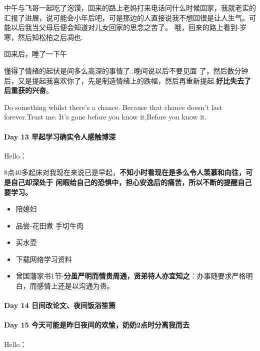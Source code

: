\documentclass[UTF8,a4paper,8pt]{ctexart}
\begin{document}
	     中午与飞哥一起吃了泡馍，回来的路上老妈打来电话问什么时候回家，我就老实的汇报了进展，说可能会小年后吧，可是那边的人直接说我不想回很是让人生气。可能以后我当父母后便会知道对儿女回家的思念之苦了。
	     哦，回来的路上看到-岁寒，然后知松柏之后凋也.
	     
	     回来后，睡了一下午
	     
	     懂得了情绪的起伏是间多么高深的事情了..晚间说以后不要见面 了，然后数分钟后，又是提起我喜欢你了，先是制造情绪上的跌幅，然后再重新提起.\textbf{好比失去了后重获的兴奋}。
	     
	     Do something whilst there's a chance. Because that chance doesn't last forever.Trust me. It's gone before you know it,Before you know it.
     \paragraph{Day 13   早起学习确实令人感触博深   \quad     }Hello：
     
	     8点40多起床对我现在来说已是早起，\textbf{不知小时看现在是多么令人羡慕和向往，可是自己却深处于 闲暇给自己的恐惧中，担心安逸后的痛苦，所以不断的提醒自己要学习。}
	     \begin{itemize}
	     	\item  \makebox[0pt][l]{$\square$}\raisebox{.15ex}{\hspace{0.1em}$\checkmark$}陪媳妇
	     	\item  品尝-花田煮 手切牛肉
	     	\item  买水壶
	     	\item  \makebox[0pt][l]{$\square$}\raisebox{.15ex}{\hspace{0.1em}$\checkmark$}下载网络学习资料
	     	\item  \makebox[0pt][l]{$\square$}\raisebox{.15ex}{\hspace{0.1em}$\checkmark$}曾国藩家书1节-\textbf{分虽严明而情贵周通，贤弟待人亦宜知之}：办事随要求严格明白，而感情上还是以沟通为贵。
	     \end{itemize}
     
     \paragraph{Day 14   日间改论文、夜间饭浴笙箫   \quad     }
     \paragraph{Day 15   今天可能是昨日夜间的欢愉，奶奶2点时分离我而去   \quad     }
	     Hello： 
	     
\end{document}
